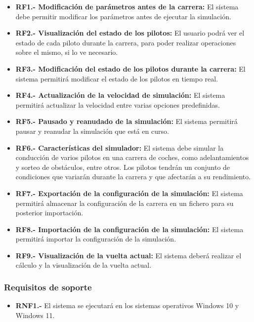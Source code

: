 \begin{itemize}
    \item \textbf{RF1.- Modificación de parámetros antes de la carrera:} El sistema debe permitir modificar los parámetros antes de ejecutar la simulación.
    \item \textbf{RF2.- Visualización del estado de los pilotos:} El usuario podrá ver el estado de cada piloto durante la carrera, para poder realizar operaciones sobre el mismo, si lo ve necesario.
    \item \textbf{RF3.- Modificación del estado de los pilotos durante la carrera:} El sistema permitirá modificar el estado de los pilotos en tiempo real.
    \item \textbf{RF4.- Actualización de la velocidad de simulación:} El sistema permitirá actualizar la velocidad entre varias opciones predefinidas.
    \item \textbf{RF5.- Pausado y reanudado de la simulación:} El sistema permitirá pausar y reanudar la simulación que está en curso.
    \item \textbf{RF6.- Características del simulador:} El sistema debe simular la conducción de varios pilotos en una carrera de coches, como adelantamientos y sorteo de obstáculos, entre otros. Los pilotos tendrán un conjunto de condiciones que variarán durante la carrera y que afectarán a su rendimiento.
    \item \textbf{RF7.- Exportación de la configuración de la simulación:} El sistema permitirá almacenar la configuración de la carrera en un fichero para su posterior importación.
    \item \textbf{RF8.- Importación de la configuración de la simulación:} El sistema permitirá importar la configuración de la simulación.
    \item \textbf{RF9.- Visualización de la vuelta actual:} El sistema deberá realizar el cálculo y la visualización de la vuelta actual.
\end{itemize}


\subsubsection{Requisitos de soporte}

\begin{itemize}
    \item \textbf{RNF1.-} El sistema se ejecutará en los sistemas operativos Windows 10 y Windows 11.
\end{itemize}

